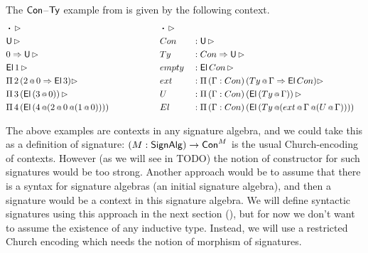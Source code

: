 \documentclass[a4paper,UKenglish,cleveref, autoref]{lipics-v2019}
\begin{document}
\begin{example}
  The $\mathsf{Con}$--$\mathsf{Ty}$ example from  is given by the
  following context.
  \begin{alignat*}{5}
    & \boldsymbol{\cdot} \,\rhd                                                 && \boldsymbol{\cdot} \,\rhd                                                                \\
    & \mathsf{U}\,\rhd                                                                  && Con && : \mathsf{U}\,\rhd                                                                        \\
    & 0\Rightarrow\mathsf{U}\,\rhd                                                              && Ty && : Con\Rightarrow\mathsf{U}\,\rhd                                                                   \\
    & \mathsf{El}\,1\,\rhd                                                              && empty && : \mathsf{El}\,Con\,\rhd                                                                \\
    & \Pi\,2\,(2\mathop{{\scriptstyle @}} 0 \Rightarrow \mathsf{El}\,3)\rhd                                       && ext && : \Pi\,(\Gamma : Con)\,(Ty\mathop{{\scriptstyle @}}\Gamma \Rightarrow \mathsf{El}\,Con)\rhd                         \\
    & \Pi\,3\,(\mathsf{El}\,(3\mathop{{\scriptstyle @}} 0))\,\rhd                                         && U && : \Pi\,(\Gamma:Con)\,(\mathsf{El}\,(Ty\mathop{{\scriptstyle @}}\Gamma))\,\rhd                                 \\
    & \Pi\,4\,(\mathsf{El}\,(4\mathop{{\scriptstyle @}}(2\mathop{{\scriptstyle @}} 0\mathop{{\scriptstyle @}} (1\mathop{{\scriptstyle @}} 0)))) \hspace{4.79em} && El && : \Pi\,(\Gamma : Con)\,(\mathsf{El}\,(Ty\mathop{{\scriptstyle @}}(ext\mathop{{\scriptstyle @}}\Gamma\mathop{{\scriptstyle @}} (U\mathop{{\scriptstyle @}}\Gamma))))
  \end{alignat*}
\end{example}

The above examples are contexts in any signature algebra, and we could
take this as a definition of signature: $(M:\mathsf{SignAlg})\rightarrow\mathsf{Con}^M$ is the
usual Church-encoding of contexts. However (as we will see in TODO)
the notion of constructor for such signatures would be too
strong. Another approach would be to assume that there is a syntax for
signature algebras (an initial signature algebra), and then a
signature would be a context in this signature algebra. We will define
syntactic signatures using this approach in the next section
(), but for now we don't want to assume
the existence of any inductive type. Instead, we will use a restricted
Church encoding which needs the notion of morphism of signatures.
\end{document}
